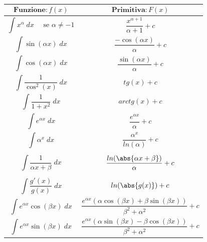 \documentclass[a4paper, 12pt]{report}
\begin{document}
        \begin{tabular}{m{} | m{}}
        \[\textbf{Funzione}: f(x)\] & \[\textbf{Primitiva}: F(x)\] \\
        \hline
        \[  \int x^{\alpha} \; dx \quad \text{ se } \alpha \neq -1\] & \[\frac{x^{\alpha +1}}{\alpha+1} + c\]\\
        \[ \int \sin(\alpha x)\; dx \] & \[\frac{-\cos(\alpha x)}{\alpha} + c\] \\
        \[ \int \cos(\alpha x)\; dx \] & \[\frac{\sin(\alpha x)}{\alpha} + c\] \\
        \[ \int \frac{1}{\cos^2(x)}\; dx \] & \[tg(x) + c\]\\
        \[ \int \frac{1}{1+x^2}\; dx \] & \[arctg(x)+c\]\\
        \[ \int  e^{\alpha x}\; dx \] & \[ \frac{e^{\alpha x}}{\alpha} + c\] \\
        \[ \int \alpha^x\; dx \] & \[\frac{\alpha^x}{ln(\alpha)}+c\] \\
        \[ \int \frac{1}{\alpha x + \beta} \; dx \] & \[\frac{ln(\abs{\alpha x + \beta})}{\alpha}+c\] \\
        \[ \int  \frac{g'(x)}{g(x)} \; dx \] & \[ ln(\abs{g(x)})+c\] \\
        \[ \int  e^{\alpha x} \cos(\beta x)\; dx \] & \[ \frac{e^{\alpha x}(\alpha \cos(\beta x) + \beta \sin(\beta x))}{\beta^2 + \alpha^2}+c\] \\
        \[ \int  e^{\alpha x} \sin(\beta x)\; dx \] & \[ \frac{e^{\alpha x}(\alpha \sin(\beta x) - \beta \cos(\beta x))}{\beta^2 + \alpha^2}+c\] \\
        
        \end{tabular}
        
\end{document}
